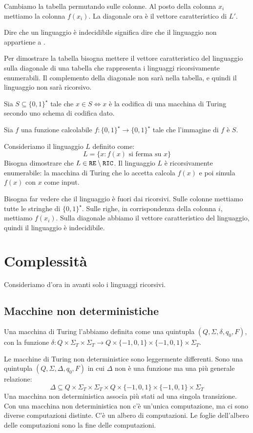 Cambiamo la tabella permutando sulle colonne. Al posto della colonna $x_i$ mettiamo la colonna $f(x_i)$. La diagonale ora \`e il vettore caratteristico di $L'$.

Dire che un linguaggio \`e indecidibile significa dire che il linguaggio non appartiene a .

Per dimostrare la tabella bisogna mettere il vettore caratteristico del linguaggio sulla diagonale di una tabella che rappresenta i linguaggi ricorsivamente enumerabili. Il complemento della diagonale non sar\`a nella tabella, e quindi il linguaggio non sar\`a ricorsivo.

Sia $S \subseteq \{ 0, 1\}^{\star}$ tale che $x \in S \iff x$ \`e la codifica di una macchina di Turing secondo uno schema di codifica dato.

Sia $f$ una funzione calcolabile $f : \{0,1\}^{\star} \to \{0,1\}^{\star}$ tale che l'immagine di $f$ \`e $S$.

\begin{esercizio}
Consideriamo il linguaggio $L$ definito come:
\[
L = \{ x : f(x) \text{ si ferma su } x \}
\]
Bisogna dimostrare che $L \in \texttt{RE} \setminus \texttt{RIC}$. Il linguaggio $L$ \`e ricorsivamente enumerabile: la macchina di Turing che lo accetta calcola $f(x)$ e poi simula $f(x)$ con $x$ come input.
\end{esercizio}

Bisogna far vedere che il linguaggio \`e fuori dai ricorsivi. Sulle colonne mettiamo tutte le stringhe di $\{0,1\}^{\star}$. Sulle righe, in corrispondenza della colonna $i$, mettiamo $f(x_i)$. Sulla diagonale abbiamo il vettore caratteristico del linguaggio, quindi il linguaggio \`e indecidibile.

\chapter{Complessit\`a}

Consideriamo d'ora in avanti solo i linguaggi ricorsivi.

\section{Macchine non deterministiche}

\begin{defn}
Una macchina di Turing l'abbiamo definita come una quintupla $(Q, \Sigma, \delta, q_0, F)$, con la funzione $\delta : Q \times \Sigma_T \times \Sigma_T \to Q \times \{-1,0,1\} \times \{-1,0,1\} \times \Sigma_T$.

Le macchine di Turing non deterministice sono leggermente differenti. Sono una quintupla $(Q, \Sigma, \Delta, q_0, F)$ in cui $\Delta$ non \`e una funzione ma una pi\`u generale relazione:
\[
\Delta \subseteq Q \times \Sigma_T \times \Sigma_T \times Q \times \{-1,0,1\} \times \{-1,0,1\} \times \Sigma_T
\]
Una macchina non deterministica associa pi\`u stati ad una singola transizione. Con una macchina non deterministica non c'\`e un'unica computazione, ma ci sono diverse computazioni distinte. C'\`e un albero di computazioni. Le foglie dell'albero delle computazioni sono la fine delle computazioni.
\end{defn}

